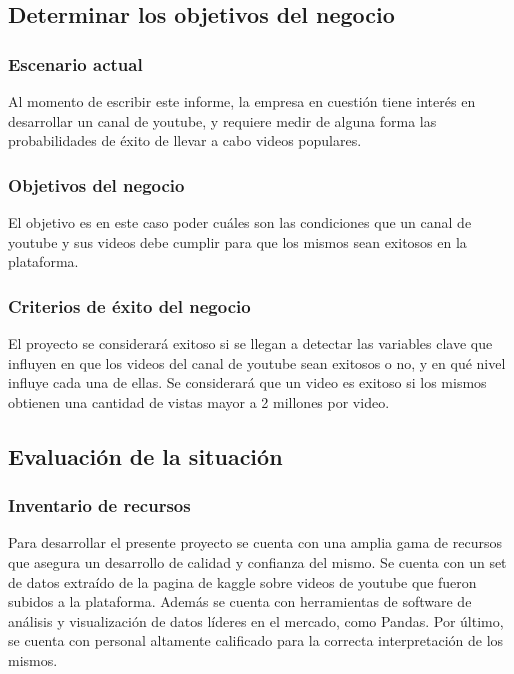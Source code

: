 \subsection{Determinar los objetivos del negocio}
    \subsubsection{Escenario actual}
    Al momento de escribir este informe, la empresa en cuestión tiene interés
    en desarrollar un canal de youtube, y requiere medir de alguna forma las
    probabilidades de éxito de llevar a cabo videos populares.
    \subsubsection{Objetivos del negocio}
    El objetivo es en este caso poder  cuáles son las condiciones que un canal
    de youtube y sus videos debe cumplir para que los mismos sean exitosos en
    la plataforma.
    \subsubsection{Criterios de éxito del negocio}
    El proyecto se considerará exitoso si se llegan a detectar las variables
    clave que influyen en que los videos del canal de youtube sean exitosos o
    no, y en qué nivel influye cada una de ellas. Se considerará que un video es
    exitoso si los mismos obtienen una cantidad de vistas mayor a 2 millones
    por video.

\subsection{Evaluación de la situación}

    \subsubsection{Inventario de recursos}

    Para desarrollar el presente proyecto se cuenta con una amplia gama de recursos que
    asegura un desarrollo de calidad y confianza del mismo.
    Se cuenta con un set de datos extraído de la pagina de kaggle sobre videos
    de youtube que fueron subidos a la plataforma. Además se cuenta con
    herramientas de software de análisis y visualización de datos líderes
    en el mercado, como Pandas. Por último, se cuenta con personal
    altamente calificado para la correcta interpretación de los mismos.

